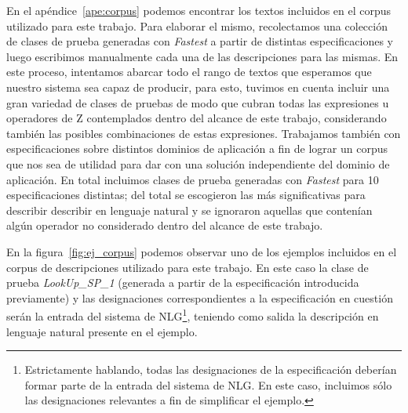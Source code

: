 En el apéndice~\ref{ape:corpus} podemos encontrar los textos incluidos en el corpus utilizado para este trabajo. Para elaborar el mismo, recolectamos una colección de clases de prueba generadas con \emph{Fastest} a partir de distintas especificaciones y luego escribimos manualmente cada una de las descripciones para las mismas. En este proceso, intentamos abarcar todo el rango de textos que esperamos que nuestro sistema sea capaz de producir, para esto, tuvimos en cuenta incluir una gran variedad de clases de pruebas de modo que cubran todas las expresiones u operadores de Z contemplados dentro del alcance de este trabajo, considerando también las posibles combinaciones de estas expresiones. Trabajamos también con especificaciones sobre distintos dominios de aplicación a fin de lograr un corpus que nos sea de utilidad para dar con una solución independiente del dominio de aplicación. En total incluimos clases de prueba generadas con \emph{Fastest} para 10 especificaciones distintas; del total se escogieron las más significativas para describir describir en lenguaje natural y se ignoraron aquellas que contenían algún operador no considerado dentro del alcance de este trabajo.


En la figura~\ref{fig:ej_corpus} podemos observar uno de los ejemplos incluidos en el corpus de descripciones utilizado para este trabajo. En este caso la clase de prueba \emph{LookUp\_SP\_1} (generada a partir de la especificación introducida previamente) y las designaciones correspondientes a la especificación en cuestión serán la entrada del sistema de NLG\footnote{Estrictamente hablando, todas las designaciones de la especificación deberían formar parte de la entrada del sistema de NLG. En este caso, incluimos sólo las designaciones relevantes a fin de simplificar el ejemplo.}, teniendo como salida la descripción en lenguaje natural presente en el ejemplo.

